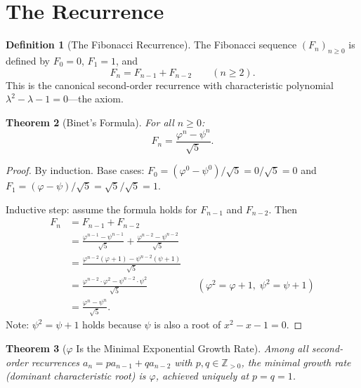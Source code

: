 \documentclass[11pt,a4paper]{article}
\theoremstyle{plain}
\newtheorem{theorem}{Theorem}[section]
\theoremstyle{definition}
\newtheorem{definition}[theorem]{Definition}
\newcommand{\Z}{\mathbb{Z}}
\newcommand{\vp}{\varphi}
\newcommand{\ps}{\psi}
\begin{document}
\section{The Recurrence}\label{sec:recurrence}

\begin{definition}[The Fibonacci Recurrence]\label{def:fibonacci}
The Fibonacci sequence $(F_{n})_{n \ge 0}$ is defined by
$F_{0} = 0$, $F_{1} = 1$, and
\begin{equation}\label{eq:fib-recurrence}
  F_{n} = F_{n-1} + F_{n-2} \qquad (n \ge 2).
\end{equation}
This is the canonical second-order recurrence with characteristic
polynomial $\lambda^{2} - \lambda - 1 = 0$---the axiom.
\end{definition}

\begin{theorem}[Binet's Formula]\label{thm:binet}
For all $n \ge 0$:
\begin{equation}\label{eq:binet}
  F_{n} = \frac{\vp^{n} - \ps^{n}}{\sqrt{5}}.
\end{equation}
\end{theorem}

\begin{proof}
By induction.  Base cases: $F_{0} = (\vp^{0} - \ps^{0})/\sqrt{5}
= 0/\sqrt{5} = 0$ and $F_{1} = (\vp - \ps)/\sqrt{5}
= \sqrt{5}/\sqrt{5} = 1$.

Inductive step: assume the formula holds for $F_{n-1}$ and $F_{n-2}$.
Then
\begin{align*}
  F_{n} &= F_{n-1} + F_{n-2}\\
  &= \frac{\vp^{n-1} - \ps^{n-1}}{\sqrt{5}}
    + \frac{\vp^{n-2} - \ps^{n-2}}{\sqrt{5}}\\
  &= \frac{\vp^{n-2}(\vp + 1) - \ps^{n-2}(\ps + 1)}{\sqrt{5}}\\
  &= \frac{\vp^{n-2} \cdot \vp^{2} - \ps^{n-2} \cdot \ps^{2}}{\sqrt{5}}
    && (\vp^{2} = \vp + 1,\; \ps^{2} = \ps + 1)\\
  &= \frac{\vp^{n} - \ps^{n}}{\sqrt{5}}.
\end{align*}
Note: $\ps^{2} = \ps + 1$ holds because $\ps$ is also a root of
$x^{2} - x - 1 = 0$.
\end{proof}

\begin{theorem}[$\vp$ Is the Minimal Exponential Growth Rate]\label{thm:phi-minimal}
Among all second-order recurrences $a_{n} = pa_{n-1} + qa_{n-2}$ with
$p, q \in \Z_{>0}$, the minimal growth rate (dominant characteristic
root) is $\vp$, achieved uniquely at $p = q = 1$.
\end{theorem}
\end{document}
